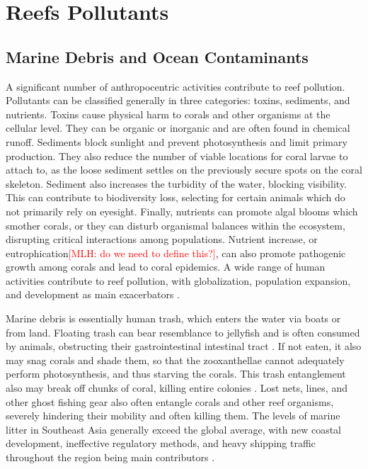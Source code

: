 \documentclass{book}\usepackage{knitr}
\newcommand{\red}[1]{\textcolor{red}{[MLH: #1]}}
\begin{document}
{\section{Reefs Pollutants}

\subsection{Marine Debris and Ocean Contaminants} \label{sub:mdoc}

A significant number of anthropocentric activities contribute to reef pollution. Pollutants can be classified generally in three categories: toxins, sediments, and nutrients. Toxins cause physical harm to corals and other organisms at the cellular level. They can be organic or inorganic and are often found in chemical runoff. Sediments block sunlight and prevent photosynthesis and limit primary production. They also reduce the number of viable locations for coral larvae to attach to, as the loose sediment settles on the previously secure spots on the coral skeleton. Sediment also increases the turbidity of the water, blocking visibility. This can contribute to biodiversity loss, selecting for certain animals which do not primarily rely on eyesight. Finally, nutrients can promote algal blooms which smother corals, or they can disturb organismal balances within the ecosystem, disrupting critical interactions among populations. Nutrient increase, or eutrophication\red{do we need to define this?}, can also promote pathogenic growth among corals and lead to coral epidemics. A wide range of human activities contribute to reef pollution, with globalization, population expansion, and development as main exacerbators \citep{4884777420100401}.

Marine debris is essentially human trash, which enters the water via boats or from land. Floating trash can bear resemblance to jellyfish and is often consumed by animals, obstructing their gastrointestinal intestinal tract \citep{coralreefalliance_2021}. If not eaten, it also may snag corals and shade them, so that the zooxanthellae cannot adequately perform photosynthesis, and thus starving the corals. This trash entanglement also may break off chunks of coral, killing entire colonies \citep{USEPA_2017}. Lost nets, lines, and other ghost fishing gear also often entangle corals and other reef organisms, severely hindering their mobility and often killing them. The levels of marine litter in Southeast Asia generally exceed the global average, with new coastal development, ineffective regulatory methods, and heavy shipping traffic throughout the region being main contributors \citep{4884777420100401}.

}
\end{document}
